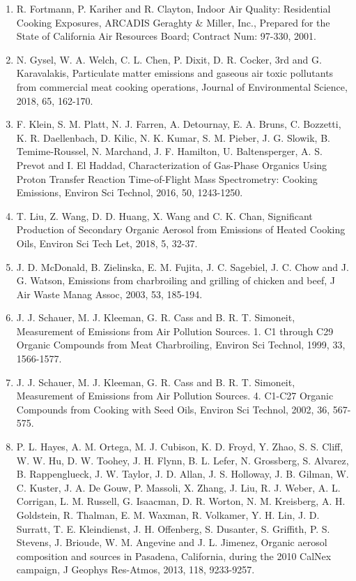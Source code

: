 \documentclass[
  11pt,
  oneside]{book}
\providecommand{\tightlist}{%
  \setlength{\itemsep}{0pt}\setlength{\parskip}{0pt}}
\begin{document}
\begin{enumerate}
\def\labelenumi{\arabic{enumi}.}
\tightlist
\item
  R. Fortmann, P. Kariher and R. Clayton, Indoor Air Quality: Residential Cooking Exposures, ARCADIS Geraghty \& Miller, Inc., Prepared for the State of California Air Resources Board; Contract Num: 97-330, 2001.
\item
  N. Gysel, W. A. Welch, C. L. Chen, P. Dixit, D. R. Cocker, 3rd and G. Karavalakis, Particulate matter emissions and gaseous air toxic pollutants from commercial meat cooking operations, Journal of Environmental Science, 2018, 65, 162-170.
\item
  F. Klein, S. M. Platt, N. J. Farren, A. Detournay, E. A. Bruns, C. Bozzetti, K. R. Daellenbach, D. Kilic, N. K. Kumar, S. M. Pieber, J. G. Slowik, B. Temime-Roussel, N. Marchand, J. F. Hamilton, U. Baltensperger, A. S. Prevot and I. El Haddad, Characterization of Gas-Phase Organics Using Proton Transfer Reaction Time-of-Flight Mass Spectrometry: Cooking Emissions, Environ Sci Technol, 2016, 50, 1243-1250.
\item
  T. Liu, Z. Wang, D. D. Huang, X. Wang and C. K. Chan, Significant Production of Secondary Organic Aerosol from Emissions of Heated Cooking Oils, Environ Sci Tech Let, 2018, 5, 32-37.
\item
  J. D. McDonald, B. Zielinska, E. M. Fujita, J. C. Sagebiel, J. C. Chow and J. G. Watson, Emissions from charbroiling and grilling of chicken and beef, J Air Waste Manag Assoc, 2003, 53, 185-194.
\item
  J. J. Schauer, M. J. Kleeman, G. R. Cass and B. R. T. Simoneit, Measurement of Emissions from Air Pollution Sources. 1. C1 through C29 Organic Compounds from Meat Charbroiling, Environ Sci Technol, 1999, 33, 1566-1577.
\item
  J. J. Schauer, M. J. Kleeman, G. R. Cass and B. R. T. Simoneit, Measurement of Emissions from Air Pollution Sources. 4. C1-C27 Organic Compounds from Cooking with Seed Oils, Environ Sci Technol, 2002, 36, 567-575.
\item
  P. L. Hayes, A. M. Ortega, M. J. Cubison, K. D. Froyd, Y. Zhao, S. S. Cliff, W. W. Hu, D. W. Toohey, J. H. Flynn, B. L. Lefer, N. Grossberg, S. Alvarez, B. Rappenglueck, J. W. Taylor, J. D. Allan, J. S. Holloway, J. B. Gilman, W. C. Kuster, J. A. De Gouw, P. Massoli, X. Zhang, J. Liu, R. J. Weber, A. L. Corrigan, L. M. Russell, G. Isaacman, D. R. Worton, N. M. Kreisberg, A. H. Goldstein, R. Thalman, E. M. Waxman, R. Volkamer, Y. H. Lin, J. D. Surratt, T. E. Kleindienst, J. H. Offenberg, S. Dusanter, S. Griffith, P. S. Stevens, J. Brioude, W. M. Angevine and J. L. Jimenez, Organic aerosol composition and sources in Pasadena, California, during the 2010 CalNex campaign, J Geophys Res-Atmos, 2013, 118, 9233-9257.

\end{enumerate}
\end{document}
